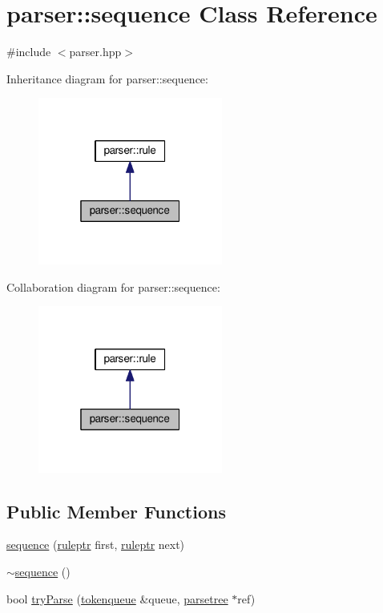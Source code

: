 \hypertarget{classparser_1_1sequence}{}\section{parser\+:\+:sequence Class Reference}
\label{classparser_1_1sequence}


{\ttfamily \#include $<$parser.\+hpp$>$}



Inheritance diagram for parser\+:\+:sequence\+:
\nopagebreak
\begin{figure}[H]
\begin{center}
\leavevmode
\includegraphics[width=172pt]{classparser_1_1sequence__inherit__graph}
\end{center}
\end{figure}


Collaboration diagram for parser\+:\+:sequence\+:
\nopagebreak
\begin{figure}[H]
\begin{center}
\leavevmode
\includegraphics[width=172pt]{classparser_1_1sequence__coll__graph}
\end{center}
\end{figure}
\subsection*{Public Member Functions}
\begin{DoxyCompactItemize}
\item 
\hyperlink{classparser_1_1sequence_a360c88bf21abc2066043c03735b5341f}{sequence} (\hyperlink{namespaceparser_a85b2df48287fddaca144a5f6c01b4761}{ruleptr} first, \hyperlink{namespaceparser_a85b2df48287fddaca144a5f6c01b4761}{ruleptr} next)
\item 
\hyperlink{classparser_1_1sequence_ac7681fd304c236f9667f48d6d53ffee7}{$\sim$sequence} ()
\item 
bool \hyperlink{classparser_1_1sequence_a499005d2dd4a3f39985d2deddb413cea}{try\+Parse} (\hyperlink{classparser_1_1tokenqueue}{tokenqueue} \&queue, \hyperlink{structparser_1_1parsetree}{parsetree} $\ast$ref)
\end{DoxyCompactItemize}
